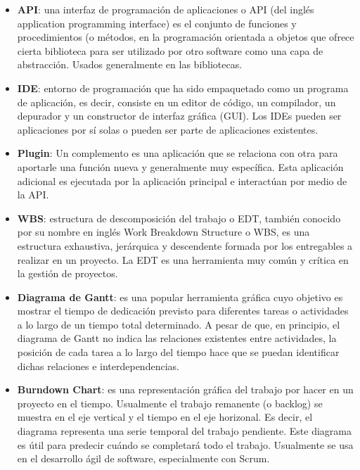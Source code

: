 \documentclass[12pt,a4paper]{article}
\begin{document}
\begin{itemize}

\item \textbf{API}: una interfaz de programación de aplicaciones o API (del inglés application programming interface) es el conjunto de funciones y procedimientos (o métodos, en la programación orientada a objetos que ofrece cierta biblioteca para ser utilizado por otro software como una capa de abstracción. Usados generalmente en las bibliotecas.

\item \textbf{IDE}: entorno de programación que ha sido empaquetado como un programa de aplicación, es decir, consiste en un editor de código, un compilador, un depurador y un constructor de interfaz gráfica (GUI). Los IDEs pueden ser aplicaciones por sí solas o pueden ser parte de aplicaciones existentes.

\item \textbf{Plugin}: Un complemento es una aplicación que se relaciona con otra para aportarle una función nueva y generalmente muy específica. Esta aplicación adicional es ejecutada por la aplicación principal e interactúan por medio de la API.

\item \textbf{WBS}: estructura de descomposición del trabajo o EDT, también conocido por su nombre en inglés Work Breakdown Structure o WBS, es una estructura exhaustiva, jerárquica y descendente formada por los entregables a realizar en un proyecto. La EDT es una herramienta muy común y crítica en la gestión de proyectos.

\item \textbf{Diagrama de Gantt}: es una popular herramienta gráfica cuyo objetivo es mostrar el tiempo de dedicación previsto para diferentes tareas o actividades a lo largo de un tiempo total determinado. A pesar de que, en principio, el diagrama de Gantt no indica las relaciones existentes entre actividades, la posición de cada tarea a lo largo del tiempo hace que se puedan identificar dichas relaciones e interdependencias.

\item \textbf{Burndown Chart}: es una representación gráfica del trabajo por hacer en un proyecto en el tiempo. Usualmente el trabajo remanente (o backlog) se muestra en el eje vertical y el tiempo en el eje horizonal. Es decir, el diagrama representa una serie temporal  del trabajo pendiente. Este diagrama es útil para predecir cuándo se completará todo el trabajo. Usualmente se usa en el desarrollo ágil de software, especialmente con Scrum.

\end{itemize}
\end{document}
